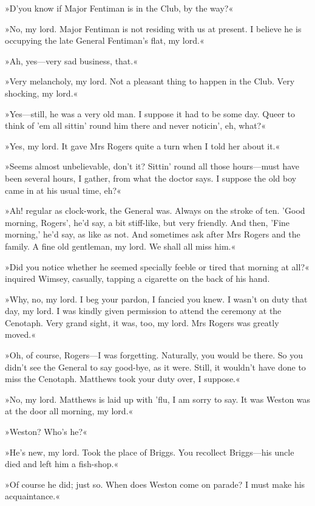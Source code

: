 »D'you know if Major Fentiman is in the Club, by the way?«

»No, my lord. Major Fentiman is not residing with us at present. I believe he is occupying the late General Fentiman's flat, my lord.«

»Ah, yes\allowbreak---\allowbreak very sad business, that.«

»Very melancholy, my lord. Not a pleasant thing to happen in the Club. Very shocking, my lord.«

»Yes\allowbreak---\allowbreak still, he was a very old man. I suppose it had to be some day. Queer to think of 'em all sittin' round him there and never noticin', eh, what?«

»Yes, my lord. It gave Mrs Rogers quite a turn when I told her about it.«

»Seems almost unbelievable, don't it? Sittin' round all those hours\allowbreak---\allowbreak must have been several hours, I gather, from what the doctor says. I suppose the old boy came in at his usual time, eh?«

»Ah! regular as clock-work, the General was. Always on the stroke of ten. 'Good morning, Rogers', he'd say, a bit stiff-like, but very friendly. And then, 'Fine morning,' he'd say, as like as not. And sometimes ask after Mrs Rogers and the family. A fine old gentleman, my lord. We shall all miss him.«

»Did you notice whether he seemed specially feeble or tired that morning at all?« inquired Wimsey, casually, tapping a cigarette on the back of his hand.

»Why, no, my lord. I beg your pardon, I fancied you knew. I wasn't on duty that day, my lord. I was kindly given permission to attend the ceremony at the Cenotaph. Very grand sight, it was, too, my lord. Mrs Rogers was greatly moved.«

»Oh, of course, Rogers\allowbreak---\allowbreak I was forgetting. Naturally, you would be there. So you didn't see the General to say good-bye, as it were. Still, it wouldn't have done to miss the Cenotaph. Matthews took your duty over, I suppose.«

»No, my lord. Matthews is laid up with 'flu, I am sorry to say. It was Weston was at the door all morning, my lord.«

»Weston? Who's he?«

»He's new, my lord. Took the place of Briggs. You recollect Briggs\allowbreak---\allowbreak his uncle died and left him a fish-shop.«

»Of course he did; just so. When does Weston come on parade? I must make his acquaintance.«

